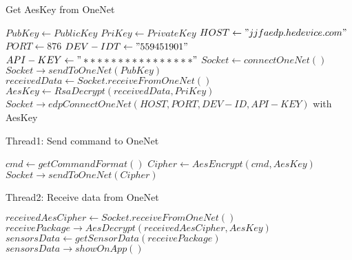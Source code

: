 \documentclass{article}
\begin{document}
\begin{algorithm}
\caption{Get AesKey from OneNet}
\begin{algorithmic}[1]
\STATE $PubKey \leftarrow Public Key$
\STATE $PriKey \leftarrow Private Key$
\STATE $HOST \leftarrow "jjfaedp.hedevice.com"$
\STATE $PORT \leftarrow 876$
\STATE $DEV-IDT \leftarrow "559451901"$
\STATE $API-KEY \leftarrow "****************"$
\STATE $Socket \leftarrow connectOneNet()$
\STATE $Socket \rightarrow sendToOneNet(PubKey)$
\STATE $receivedData \leftarrow Socket.receiveFromOneNet()$
\STATE $AesKey \leftarrow RsaDecrypt(receivedData,PriKey)$
\STATE $Socket \rightarrow edpConnectOneNet(HOST,PORT,DEV-ID,API-KEY)$ with AesKey
\end{algorithmic}
\end{algorithm}

\begin{algorithm}
\caption{Thread1: Send command to OneNet}
\begin{algorithmic}[1]
\STATE $cmd \leftarrow getCommandFormat()$
\STATE $Cipher \leftarrow AesEncrypt(cmd,AesKey)$
\STATE $Socket \rightarrow sendToOneNet(Cipher)$
\ENDIF
\ENDWHILE
\end{algorithmic}
\end{algorithm}

\begin{algorithm}
\caption{Thread2: Receive data from OneNet}
\begin{algorithmic}[1]
\STATE $receivedAesCipher \leftarrow Socket.receiveFromOneNet()$
\STATE $receivePackage \rightarrow AesDecrypt(receivedAesCipher,AesKey)$
\STATE $sensorsData \leftarrow getSensorData(receivePackage)$
\STATE $sensorsData \rightarrow showOnApp()$
\ENDWHILE
\end{algorithmic}
\end{algorithm}
\end{document}
